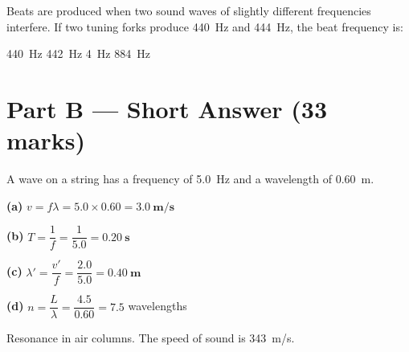 \documentclass[addpoints]{exam}
\begin{document}
\begin{questions}
\question[1] Beats are produced when two sound waves of slightly different frequencies
interfere. If two tuning forks produce \SI{440}{Hz} and \SI{444}{Hz}, the beat frequency is:
\begin{choices}
    \choice \SI{440}{Hz}
    \choice \SI{442}{Hz}
    \correctchoice \SI{4}{Hz}
    \choice \SI{884}{Hz}
\end{choices}


\section*{Part B --- Short Answer (33 marks)}

\question A wave on a string has a frequency of \SI{5.0}{Hz} and a wavelength of
\SI{0.60}{m}.
\begin{solution}[8cm]
\textbf{(a)} $v = f\lambda = 5.0 \times 0.60 = \mathbf{\SI{3.0}{m/s}}$

\textbf{(b)} $T = \dfrac{1}{f} = \dfrac{1}{5.0} = \mathbf{\SI{0.20}{s}}$

\textbf{(c)} $\lambda' = \dfrac{v'}{f} = \dfrac{2.0}{5.0} = \mathbf{\SI{0.40}{m}}$

\textbf{(d)} $n = \dfrac{L}{\lambda} = \dfrac{4.5}{0.60} = \mathbf{7.5}$ wavelengths
\end{solution}

\question Resonance in air columns. The speed of sound is \SI{343}{m/s}.
\end{questions}
\end{document}
